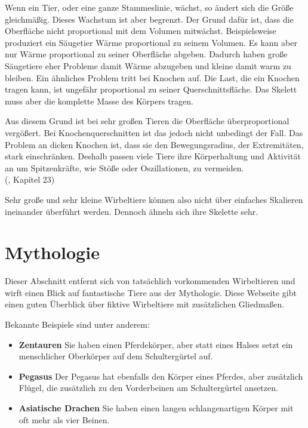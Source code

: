 Wenn ein Tier, oder eine ganze Stammeslinie, wächst, so ändert sich die Größe gleichmäßig. Dieses Wachstum ist aber begrenzt. Der Grund dafür ist, dass die Oberfläche nicht proportional mit dem Volumen mitwächst. Beispielsweise produziert ein Säugetier Wärme proportional zu seinem Volumen. Es kann aber nur Wärme proportional zu seiner Oberfläche abgeben. Dadurch haben große Säugetiere eher Probleme damit Wärme abzugeben und kleine damit warm zu bleiben. Ein ähnliches Problem tritt bei Knochen auf. Die Last, die ein Knochen tragen kann, ist ungefähr proportional zu seiner Querschnittsfläche. Das Skelett muss aber die komplette Masse des Körpers tragen.

Aus diesem Grund ist bei sehr großen Tieren die Oberfläche überproportional vergößert. Bei Knochenquerschnitten ist das jedoch nicht unbedingt der Fall. Das Problem an dicken Knochen ist, dass sie den Bewegungsradius, \zb der Extremitäten, stark einschränken. Deshalb passen viele Tiere ihre Körperhaltung und Aktivität an um Spitzenkräfte, wie Stöße oder Oszillationen, zu vermeiden.\\ (\cite{Vergleichende_Anatomie}, Kapitel 23)

Sehr große und sehr kleine Wirbeltiere können also nicht über einfaches Skalieren ineinander überführt werden. Dennoch ähneln sich ihre Skelette sehr.


\section{Mythologie}
\label{biology_mythology}

Dieser Abschnitt entfernt sich von tatsächlich vorkommenden Wirbeltieren und wirft einen Blick auf fantastische Tiere aus der Mythologie. Diese Webseite \cite{vertebrateExtraLimbs} gibt einen guten Überblick über fiktive Wirbeltiere mit zusätzlichen Gliedmaßen. 

Bekannte Beispiele sind unter anderem:
\begin{itemize}
 \item \textbf{Zentauren} Sie haben einen Pferdekörper, aber statt eines Halses setzt ein menschlicher Oberkörper auf dem Schultergürtel auf. \cite{centaurs}
 
 \item \textbf{Pegasus} Der Pegasus hat ebenfalls den Körper eines Pferdes, aber zusätzlich Flügel, die zusätzlich zu den Vorderbeinen am Schultergürtel ansetzen. \cite{pegasus}
 
 \item \textbf{Asiatische Drachen} Sie haben einen langen schlangenartigen Körper mit oft mehr als vier Beinen.
\end{itemize}
